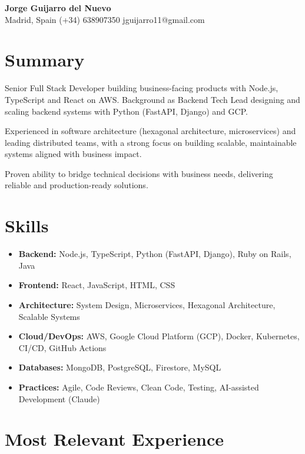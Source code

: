 \documentclass[10pt,a4paper]{article}
\begin{document}
\begin{center}
    {\LARGE \textbf{Jorge Guijarro del Nuevo}} \\
    \vspace{2pt}
    Madrid, Spain \textbullet{} (+34) 638907350 \textbullet{} jguijarro11@gmail.com
\end{center}

\section{Summary}
Senior Full Stack Developer building business-facing products with Node.js, TypeScript and React on AWS. Background as Backend Tech Lead designing and scaling backend systems with Python (FastAPI, Django) and GCP.
\smallskip

Experienced in software architecture (hexagonal architecture, microservices) and leading distributed teams, with a strong focus on building scalable, maintainable systems aligned with business impact.
\smallskip

Proven ability to bridge technical decisions with business needs, delivering reliable and production-ready solutions.

\section{Skills}
\begin{itemize}
    \item \textbf{Backend:} Node.js, TypeScript, Python (FastAPI, Django), Ruby on Rails, Java
    \item \textbf{Frontend:} React, JavaScript, HTML, CSS
    \item \textbf{Architecture:} System Design, Microservices, Hexagonal Architecture, Scalable Systems
    \item \textbf{Cloud/DevOps:} AWS, Google Cloud Platform (GCP), Docker, Kubernetes, CI/CD, GitHub Actions
    \item \textbf{Databases:} MongoDB, PostgreSQL, Firestore, MySQL
    \item \textbf{Practices:} Agile, Code Reviews, Clean Code, Testing, AI-assisted Development (Claude)
\end{itemize}

\section{Most Relevant Experience}
\end{document}
